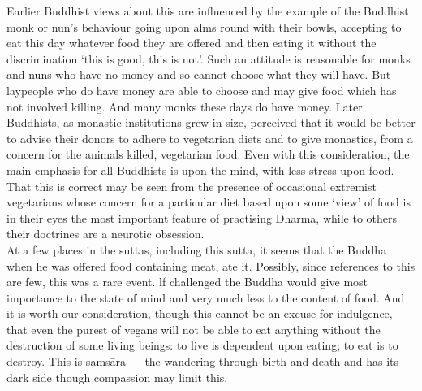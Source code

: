 Earlier Buddhist views about this are inﬂuenced by the example of the Buddhist monk or nun's behaviour going upon alms round with their bowls, accepting to eat this day whatever food they are offered and then eating it without the discrimination `this is good, this is not'. Such an attitude is reasonable for monks and nuns who have no money and so cannot choose what they will have. But laypeople who do have money are able to choose and may give food which has not involved killing. And many monks these days do have money. Later Buddhists, as monastic institutions grew in size, perceived that it would be better to advise their donors to adhere to vegetarian diets and to give monastics, from a concern for the animals killed, vegetarian food. Even with this consideration, the main emphasis for all Buddhists is upon the mind, with less stress upon food. That this is correct may be seen from the presence of occasional extremist vegetarians whose concern for a particular diet based upon some `view' of food is in their eyes the most important feature of practising Dharma, while to others their doctrines are a neurotic obsession.\\
  
At a few places in the suttas, including this sutta, it seems that the Buddha when he was offered food containing meat, ate it. Possibly, since references to this are few, this was a rare event. lf challenged the Buddha would give most importance to the state of mind and very much less to the content of food. And it is worth our consideration, though this cannot be an excuse for indulgence, that even the purest of vegans will not be able to eat anything without the destruction of some living beings: to live is dependent upon eating; to eat is to destroy. This is sams\=ara — the wandering through birth and death and has its dark side though compassion may limit this.\\

